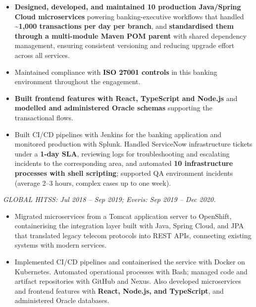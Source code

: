 {
\begin{itemize}
    \item \textbf{Designed, developed, and maintained 10 production Java/Spring Cloud microservices} powering banking-executive workflows that handled \textbf{\textasciitilde 1{,}000 transactions per day per branch}, and \textbf{standardised them through a multi-module Maven POM parent} with shared dependency management, ensuring consistent versioning and reducing upgrade effort across all services.
    \item Maintained compliance with \textbf{ISO 27001 controls} in this banking environment throughout the engagement.
    \item \textbf{Built frontend features with React, TypeScript and Node.js} and \textbf{modelled and administered Oracle schemas} supporting the transactional flows.
    \item Built CI/CD pipelines with Jenkins for the banking application and monitored production with Splunk. Handled ServiceNow infrastructure tickets under a \textbf{1-day SLA}, reviewing logs for troubleshooting and escalating incidents to the corresponding area, and automated \textbf{10 infrastructure processes with shell scripting}; supported QA environment incidents (average 2--3 hours, complex cases up to one week).
\end{itemize}

\textit{GLOBAL HITSS: Jul 2018 -- Sep 2019; Everis: Sep 2019 -- Dec 2020.}\par\vspace{3pt}
\begin{itemize}
    \item Migrated microservices from a Tomcat application server to OpenShift, containerising the integration layer built with Java, Spring Cloud, and JPA that translated legacy telecom protocols into REST APIs, connecting existing systems with modern services.
    \item Implemented CI/CD pipelines and containerised the service with Docker on Kubernetes. Automated operational processes with Bash; managed code and artifact repositories with GitHub and Nexus. Also developed microservices and frontend features with \textbf{React, Node.js, and TypeScript}, and administered Oracle databases.
\end{itemize}

}
